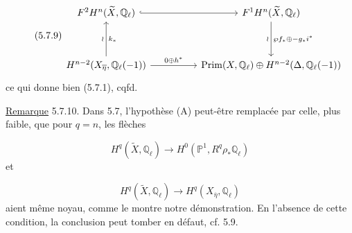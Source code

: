 \begin{equation}\tag{5.7.9}
\begin{tikzcd}[column sep=huge, row sep=huge]
F^2H^n(\widetilde{X},\mathbb{Q}_\ell) \arrow[r, hook] & F^1H^n(\widetilde{X},\mathbb{Q}_\ell) \arrow[d, "\wr"', "\wp f_*\oplus -g_*i^*"] \\
H^{n-2}(X_{\overline{\eta}},\mathbb{Q}_\ell(-1)) \arrow[u, "\wr", "k_*"'] \arrow[r, "0 \oplus h^*"] & \mathrm{Prim}(X,\mathbb{Q}_\ell)\oplus H^{n-2}(\Delta,\mathbb{Q}_\ell(-1))
\end{tikzcd}
\end{equation}
ce qui donne bien (5.7.1), cqfd.



\underline{Remarque} 5.7.10. Dans 5.7, l'hypothèse (A) peut-être remplacée par celle, plus faible, que pour $q = n$, les flèches

\begin{equation}\tag{5.7.11}
H^q(\widetilde{X},\mathbb{Q}_\ell) \longrightarrow H^0(\mathbb{P}^1,R^q\rho_*\mathbb{Q}_\ell)
\end{equation}
et

\begin{equation}\tag{5.7.12}
H^q(\widetilde{X},\mathbb{Q}_\ell) \longrightarrow H^q(X_{\overline{\eta}},\mathbb{Q}_\ell)
\end{equation}
aient même noyau, comme le montre notre démonstration. En l'absence de cette condition, la conclusion peut tomber en défaut, cf. 5.9.


